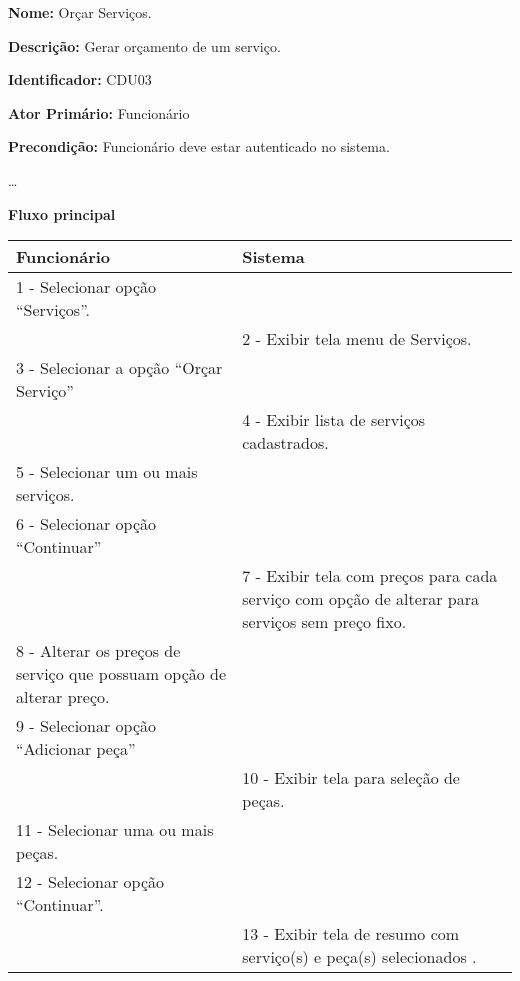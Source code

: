 \par
\textbf{Nome:} Orçar Serviços.
\par
\textbf{Descrição:} Gerar orçamento de um serviço. 
\par 
\textbf{Identificador:} CDU03
\par
\textbf{Ator Primário:} Funcionário	
\par
\textbf{Precondição:} Funcionário deve estar autenticado no sistema.
\par	
\ldots
\par
\textbf{Fluxo principal}\par
\begin{tabular}{|p{7cm}|p{7cm}|}
	\hline 
	Funcionário & Sistema \\ 
	\hline 
	
	
	1 - Selecionar opção “Serviços”. 
	&  \\ 
	\hline 
	& 
	
	2 - Exibir tela menu de Serviços.
	\\ 
	\hline 
	
	
	3 - Selecionar a opção “Orçar Serviço”
	&  \\ 
	\hline 
	& 
	
	4 - Exibir lista de serviços cadastrados.
	\\ 
	\hline 
	
	
	5 - Selecionar um ou mais serviços.
	&  \\ 
	\hline 
	
	
	6 - Selecionar opção “Continuar”
	&  \\ 
	\hline 
	& 
	
	7 - Exibir tela com preços para cada serviço com opção de alterar para serviços sem preço fixo. 
	\\ 
	\hline 
	
	
	8 - Alterar os preços de serviço que possuam opção de alterar preço.
	&  \\ 
	\hline 
	
	
	9 - Selecionar opção “Adicionar peça”
	&  \\ 
	\hline 
	& 
	
	10 - Exibir tela para seleção de peças. 
	\\ 
	\hline 
	
	
	11 - Selecionar uma ou mais peças.
	&  \\ 
	\hline 
	
	
	12 - Selecionar opção “Continuar”.
	&  \\ 
	\hline 
	& 
	
	13 - Exibir tela de resumo com serviço(s) e peça(s) selecionados .
	\\ 
	\hline 
	

\end{tabular}
